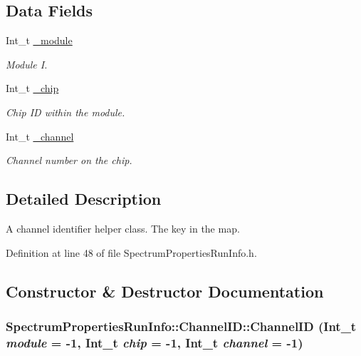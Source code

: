 \subsection*{Data Fields}
\begin{DoxyCompactItemize}
\item 
Int\_\-t \hyperlink{class_spectrum_properties_run_info_1_1_channel_i_d_a6f0c9069040d61b614f91152d80e7fa9}{\_\-module}
\begin{DoxyCompactList}\small\item\em Module I. \item\end{DoxyCompactList}\item 
Int\_\-t \hyperlink{class_spectrum_properties_run_info_1_1_channel_i_d_a4aa4404441ca9ef720a7a1dbcf412aae}{\_\-chip}
\begin{DoxyCompactList}\small\item\em Chip ID within the module. \item\end{DoxyCompactList}\item 
Int\_\-t \hyperlink{class_spectrum_properties_run_info_1_1_channel_i_d_a1a17e4dd2a69226553d3727f313cfb20}{\_\-channel}
\begin{DoxyCompactList}\small\item\em Channel number on the chip. \item\end{DoxyCompactList}\end{DoxyCompactItemize}


\subsection{Detailed Description}
A channel identifier helper class. The key in the map. 

Definition at line 48 of file SpectrumPropertiesRunInfo.h.

\subsection{Constructor \& Destructor Documentation}
\hypertarget{class_spectrum_properties_run_info_1_1_channel_i_d_a6236116c05bc9cdd93fc5f2bc84a5401}{
\subsubsection[{ChannelID}]{\setlength{\rightskip}{0pt plus 5cm}SpectrumPropertiesRunInfo::ChannelID::ChannelID (Int\_\-t {\em module} = {\ttfamily -\/1}, \/  Int\_\-t {\em chip} = {\ttfamily -\/1}, \/  Int\_\-t {\em channel} = {\ttfamily -\/1})}}
\label{class_spectrum_properties_run_info_1_1_channel_i_d_a6236116c05bc9cdd93fc5f2bc84a5401}


